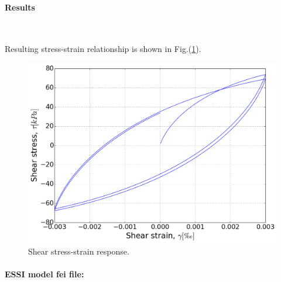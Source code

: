 \paragraph{Results} ~

Resulting stress-strain relationship is shown in Fig.(\ref{fig_ShearBeam_result}). 

\begin{figure}[!htb]
  \centering
  \includegraphics[width=12cm]{./Figure-files/_Chapter_Appendix_Illustrative_Examples/pisanoLT_test01.png}
  \caption{Shear stress-strain response.}
  \label{fig_ShearBeam_result}
\end{figure}

\paragraph{ESSI model fei file: } ~

